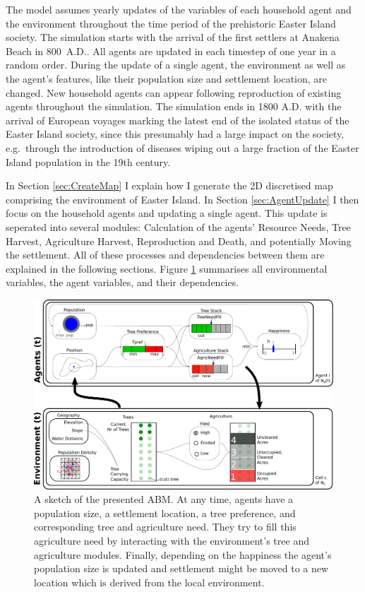 The model assumes yearly updates of the variables of each household agent and the environment throughout the time period of the prehistoric Easter Island society.
The simulation starts with the arrival of the first settlers at Anakena Beach in 800\, A.D.. 
All agents are updated in each timestep of one year in a random order. 
During the update of a single agent, the environment as well as the agent's features, like their population size and settlement location, are changed.
New household agents can appear following reproduction of existing agents throughout the simulation. 
The simulation ends in 1800 A.D. with the arrival of European voyages marking the latest end of the isolated status of the Easter Island society, since this presumably had a large impact on the society, e.g.\ through the introduction of diseases wiping out a large fraction of the Easter Island population in the 19th century.%

In Section \ref{sec:CreateMap} I explain how I generate the 2D discretised map comprising the environment of Easter Island. In Section \ref{sec:AgentUpdate} I then focus on the household agents and updating a single agent.
This update is seperated into several modules: Calculation of the agents' Resource Needs, Tree Harvest, Agriculture Harvest, Reproduction and Death, and potentially Moving the settlement.
All of these processes and dependencies between them are explained in the following sections. Figure \ref{fig:SketchABM} summarises all environmental variables, the agent variables, and their dependencies.


\begin{figure}[H]
	\centering
	\includegraphics[width=1\textwidth]{images/SketchABM/SketchABM.pdf}
	\caption{A sketch of the presented ABM. At any time, agents have a population size, a settlement location, a tree preference, and corresponding tree and agriculture need. They try to fill this agriculture need by interacting with the environment's tree and agriculture modules. Finally, depending on the happiness the agent's population size is updated and settlement might be moved to a new location which is derived from the local environment.}
	\label{fig:SketchABM}
\end{figure}


